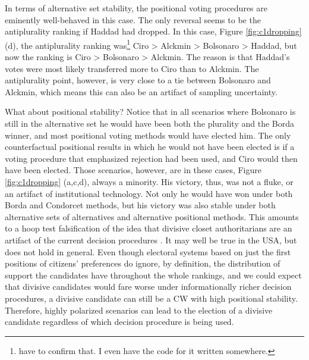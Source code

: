 \documentclass[hidelinks,11pt]{article}
\begin{document}
In terms of alternative set stability, the positional voting
procedures are eminently well-behaved in this case. The only reversal seems to be the
antiplurality ranking if Haddad had dropped. In this case, Figure
\ref{fig:c1dropping} (d), the antiplurality ranking was\footnote{\texts have to
  confirm that. I even have the code for it written somewhere.} Ciro > Alckmin >
Bolsonaro > Haddad, but now the ranking is Ciro > Bolsonaro > Alckmin. The
reason is that Haddad's votes were most likely transferred more to Ciro
than to Alckmin. The antiplurality point, however, is very close to a tie
between Bolsonaro and Alckmin, which means this can also be an artifact
of sampling uncertainty.


What about positional stability? Notice that in all scenarios where Bolsonaro is still in the alternative set he would have been both the plurality and the Borda winner, and most positional voting methods would have elected him. The only counterfactual positional results in which he would not have been elected is if a voting procedure that emphasized rejection had been used, and Ciro would then have been elected. Those scenarios, however, are in these cases, Figure \ref{fig:c1dropping} (a,c,d), always a minority. His victory, thus, was not a fluke, or an artifact of institutional technology. Not only he would have won under both Borda and Condorcet methods, but his victory was also stable under both alternative sets of alternatives and alternative positional methods. This amounts to a hoop test falsification of the idea that divisive closet authoritarians are an artifact of the current decision procedures \parencite{mahoney2006tale}. It may well be true in the USA, but does not hold in general. Even though electoral systems based on just the first positions of citizens' preferences do ignore, by definition, the distribution of support the candidates have throughout the whole rankings, and we could expect that divisive candidates would fare worse under informationally richer decision procedures, a divisive candidate can still be a CW with high positional stability. Therefore, highly polarized scenarios can lead to the election of a divisive candidate regardless of which decision procedure is being used.
\end{document}

